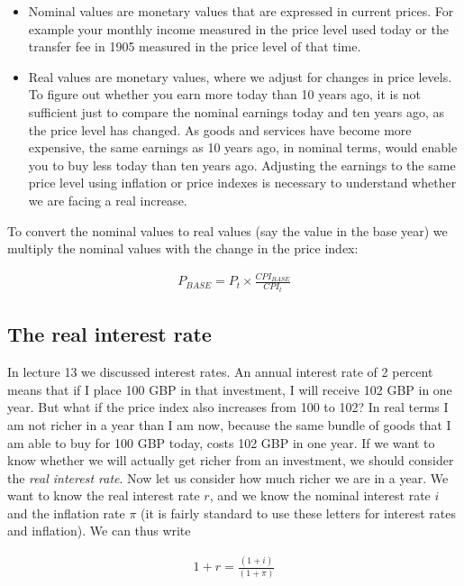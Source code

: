 \documentclass[]{book}
\begin{document}
\begin{itemize}
\item
  Nominal values are monetary values that are expressed in current prices. For example your monthly income measured in the price level used today or the transfer fee in 1905 measured in the price level of that time.
\item
  Real values are monetary values, where we adjust for changes in price levels. To figure out whether you earn more today than 10 years ago, it is not sufficient just to compare the nominal earnings today and ten years ago, as the price level has changed. As goods and services have become more expensive, the same earnings as 10 years ago, in nominal terms, would enable you to buy less today than ten years ago. Adjusting the earnings to the same price level using inflation or price indexes is necessary to understand whether we are facing a real increase.
\end{itemize}

To convert the nominal values to real values (say the value in the base year) we multiply the nominal values with the change in the price index:

\begin{align}
    P_{BASE}=P_t\times \frac{CPI_{BASE} }{CPI_t}
\end{align}

\hypertarget{the-real-interest-rate}{%
\subsection{The real interest rate}\label{the-real-interest-rate}}

In lecture 13 we discussed interest rates. An annual interest rate of 2 percent means that if I place 100 GBP in that investment, I will receive 102 GBP in one year. But what if the price index also increases from 100 to 102? In real terms I am not richer in a year than I am now, because the same bundle of goods that I am able to buy for 100 GBP today, costs 102 GBP in one year. If we want to know whether we will actually get richer from an investment, we should consider the \emph{real interest rate}. Now let us consider how much richer we are in a year. We want to know the real interest rate \(r\), and we know the nominal interest rate \(i\) and the inflation rate \(\pi\) (it is fairly standard to use these letters for interest rates and inflation). We can thus write

\begin{align}
    1+r= \frac{(1+i)}{(1+\pi)}
\end{align}
\end{document}
